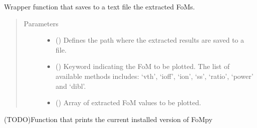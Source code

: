 \documentclass[letterpaper,10pt,english,openany, oneside]{sphinxmanual}
\begin{document}
\begin{fulllineitems}
\label{\detokenize{index:fompy.wrappers.savetotxt}}
Wrapper function that saves to a text file the extracted FoMs.
\begin{quote}\begin{description}
\item[{Parameters}] \leavevmode\begin{itemize}
\item {} 
 () \textendash{} Defines the path where the extracted results are saved to a file.

\item {} 
 () \textendash{} Keyword indicating the FoM to be plotted. The list of available methods includes:
‘vth’, ‘ioff’, ‘ion’, ‘ss’, ‘ratio’, ‘power’ and ‘dibl’.

\item {} 
 () \textendash{} Array of extracted FoM values to be plotted.

\end{itemize}

\end{description}\end{quote}

\end{fulllineitems}


\begin{fulllineitems}
\label{\detokenize{index:fompy.wrappers.version}}
(TODO)Function that prints the current installed version of FoMpy

\end{fulllineitems}
\end{document}
